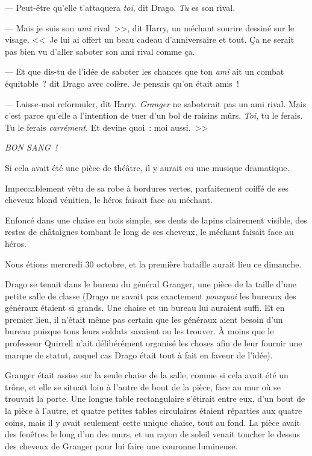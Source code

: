 --- Peut-être qu'elle t'attaquera \emph{toi}, dit Drago. \emph{Tu} es son rival.

--- Mais je suis son \emph{ami} rival~>>, dit Harry, un méchant sourire dessiné sur le visage. <<~Je lui ai offert un beau cadeau d'anniversaire et tout. Ça ne serait pas bien vu d'aller saboter son ami rival comme ça.

--- Et que dis-tu de l'idée de saboter les chances que ton \emph{ami} ait un combat équitable~? dit Drago avec colère. Je pensais qu'on était amis~!

--- Laisse-moi reformuler, dit Harry. \emph{Granger} ne saboterait pas un ami rival. Mais c'est parce qu'elle a l'intention de tuer d'un bol de raisins mûrs. \emph{Toi}, tu le ferais. Tu le ferais \emph{carrément}. Et devine quoi~: moi aussi.~>>

\emph{BON SANG~!}

\later

Si cela avait été une pièce de théâtre, il y aurait eu une musique dramatique.

Impeccablement vêtu de sa robe à bordures vertes, parfaitement coiffé de ses cheveux blond vénitien, le héros faisait face au méchant.

Enfoncé dans une chaise en bois simple, ses dents de lapins clairement visible, des restes de châtaignes tombant le long de ses cheveux, le méchant faisait face au héros.

Nous étions mercredi 30 octobre, et la première bataille aurait lieu ce dimanche.

Drago se tenait dans le bureau du général Granger, une pièce de la taille d'une petite salle de classe (Drago ne savait pas exactement \emph{pourquoi} les bureaux des généraux étaient si grands. Une chaise et un bureau lui auraient suffi. Et en premier lieu, il n'était même pas certain que les généraux aient besoin d'un bureau puisque tous leurs soldats savaient ou les trouver. À moins que le professeur Quirrell n'ait délibérément organisé les choses afin de leur fournir une marque de statut, auquel cas Drago était tout à fait en faveur de l'idée).

Granger était assise sur la seule chaise de la salle, comme si cela avait été un trône, et elle se situait loin à l'autre de bout de la pièce, face au mur où se trouvait la porte. Une longue table rectangulaire s'étirait entre eux, d'un bout de la pièce à l'autre, et quatre petites tables circulaires étaient réparties aux quatre coins, mais il y avait seulement cette unique chaise, tout au fond. La pièce avait des fenêtres le long d'un des murs, et un rayon de soleil venait toucher le dessus des cheveux de Granger pour lui faire une couronne lumineuse.

